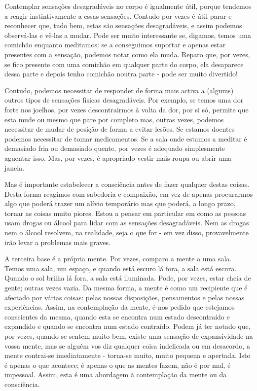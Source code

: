 Contemplar sensações desagradáveis no corpo é igualmente útil, porque
tendemos a reagir instintivamente a essas sensações. Contudo por vezes é
útil parar e reconhecer que, tudo bem, estas são sensações
desagradáveis, e assim podemos observá-las e vê-las a mudar. Pode ser
muito interessante se, digamos, temos uma comichão enquanto meditamos:
se a conseguimos suportar e apenas estar presentes com a sensação,
podemos notar como ela muda. Reparo que, por vezes, se fico presente com
uma comichão em qualquer parte do corpo, ela desaparece dessa parte e
depois tenho comichão noutra parte - pode ser muito divertido!

Contudo, podemos necessitar de responder de forma mais activa a (algums)
outros tipos de sensações físicas desagradáveis. Por exemplo, se temos
uma dor forte nos joelhos, por vezes descontrairmos à volta da dor, por
si só, permite que esta mude ou mesmo que pare por completo mas, outras
vezes, podemos necessitar de mudar de posição de forma a evitar lesões.
Se estamos doentes podemos necessitar de tomar medicamentos. Se a sala
onde estamos a meditar é demasiado fria ou demasiado quente, por vezes é
adequado simplesmente aguentar isso. Mas, por vezes, é apropriado vestir
mais roupa ou abrir uma janela.

Mas é importante estabelecer a consciência antes de fazer qualquer
destas coisas. Desta forma reagimos com sabedoria e compaixão, em vez de
apenas procurarmos algo que poderá trazer um alívio temporário mas que
poderá, a longo prazo, tornar as coisas muito piores. Estou a pensar em
particular em como as pessoas usam drogas ou álcool para lidar com as
sensações desagradáveis. Nem as drogas nem o álcool resolvem, na
realidade, seja o que for - em vez disso, provavelmente irão levar a
problemas mais graves.

A terceira base é a própria mente. Por vezes, comparo a mente a uma
sala. Temos uma sala, um espaço, e quando está escuro lá fora, a sala
está escura. Quando o sol brilha lá fora, a sala está iluminada. Pode,
por vezes, estar cheia de gente; outras vezes vazia. Da mesma forma, a
mente é como um recipiente que é afectado por várias coisas: pelas
nossas disposições, pensamentos e pelas nossas experiências. Assim, na
contemplação da mente, é-nos pedido que estejamos conscientes da mesma,
quando esta se encontra num estado descontraído e expandido e quando se
encontra num estado contraído. Podem já ter notado que, por vezes,
quando se sentem muito bem, existe uma sensação de expansividade na
vossa mente, mas se alguém vos diz qualquer coisa indelicada ou em
desacordo, a mente contrai-se imediatamente - torna-se muito, muito
pequena e apertada. Isto é apenas o que acontece; é apenas o que as
mentes fazem, não é por mal, é impessoal. Assim, esta é uma abordagem à
contemplação da mente ou da consciência.

